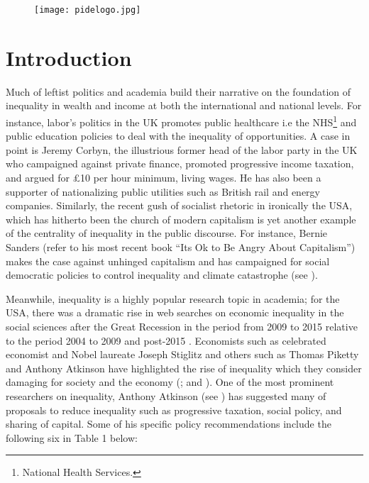 \documentclass[12pt]{article}
\newcommand{\1}{\mathbbm 1}
\begin{document}
		\newpage{}
		
		\begin{figure}[H]
			\begin{center}
				\texttt{[image: pidelogo.jpg]}		
				\caption*{}
			\end{center}
		\end{figure}
		
		\vspace{-8ex}
		
		
		
		\tableofcontents
		
		\newpage{}
		
		\vspace{-8ex}
		
		
		\section{Introduction}
		
	Much of leftist politics and academia build their narrative on the foundation of inequality in wealth and income at both the international and national levels. For instance, labor's politics in the UK promotes public healthcare i.e the NHS\footnote{National Health Services.} and public education policies to deal with the inequality of opportunities. A case in point is Jeremy Corbyn, the illustrious former head of the labor party in the UK who campaigned against private finance, promoted progressive income taxation, and argued for \pounds 10 per hour minimum, living wages. He has also been a supporter of nationalizing public utilities such as British rail and energy companies. Similarly, the recent gush of socialist rhetoric in ironically the USA, which has hitherto been the church of modern capitalism is yet another example of the centrality of inequality in the public discourse. For instance, Bernie Sanders (refer to his most recent book ``Its Ok to Be Angry About Capitalism'') makes the case against unhinged capitalism and has campaigned for social democratic policies to control inequality and climate catastrophe (see \cite{sanders2023}).
	
	
	Meanwhile, inequality is a highly popular research topic in academia; for the USA, there was a dramatic rise in web searches on economic inequality in the social sciences after the Great Recession in the period from 2009 to 2015 relative to the period 2004 to 2009 and post-2015 \cite{googletrendsinequality}. Economists such as celebrated economist and Nobel laureate Joseph Stiglitz and others such as Thomas Piketty and Anthony Atkinson have highlighted the rise of inequality which they consider damaging for society and the economy (\cite{stiglitz2012}; \cite{piketty2017capital} and \cite{piketty2022brief}).
	One of the most prominent researchers on inequality, Anthony Atkinson (see \cite{atkinson2015inequality}) has suggested many of proposals to reduce inequality such as progressive  taxation,  social  policy,  and  sharing  of  capital. Some of his specific policy recommendations include the following six in Table 1 below:
\end{document}
